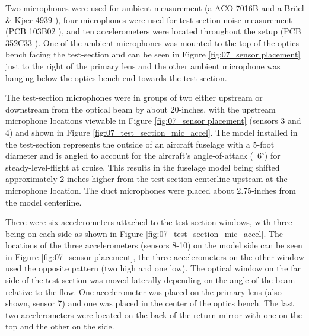 Two microphones were used for ambient measurement (a ACO 7016B \cite{ACO-Microphones} and a Br\"uel \& Kj\ae r 4939 \cite{Bruel-Kjaer-4939}), four microphones were used for test-section noise measurement (PCB 103B02 \cite{PCB-103B02-C}), and ten accelerometers were located throughout the setup (PCB 352C33 \cite{PCB-352C33-H}).
One of the ambient microphones was mounted to the top of the optics bench facing the test-section and can be seen in Figure \ref{fig:07_sensor placement} just to the right of the primary lens and the other ambient microphone was hanging below the optics bench end towards the test-section.

The test-section microphones were in groups of two either upstream or downstream from the optical beam by about 20-inches, with the upstream microphone locations viewable in Figure \ref{fig:07_sensor placement} (sensors 3 and 4) and shown in Figure \ref{fig:07_test_section_mic_accel}.
The model installed in the test-section represents the outside of an aircraft fuselage with a 5-foot diameter and is angled to account for the aircraft's angle-of-attack (~6$^\circ$) for steady-level-flight at cruise.
This results in the fuselage model being shifted approximately 2-inches higher from the test-section centerline upsteam at the microphone location.
The duct microphones were placed about 2.75-inches from the model centerline.

There were six accelerometers attached to the test-section windows, with three being on each side as shown in Figure \ref{fig:07_test_section_mic_accel}.
The locations of the three accelerometers (sensors 8-10) on the model side can be seen in Figure \ref{fig:07_sensor placement}, the three accelerometers on the other window used the opposite pattern (two high and one low).
The optical window on the far side of the test-section was moved laterally depending on the angle of the beam relative to the flow.
One accelerometer was placed on the primary lens (also shown, sensor 7) and one was placed in the center of the optics bench.
The last two accelerometers were located on the back of the return mirror with one on the top and the other on the side.

